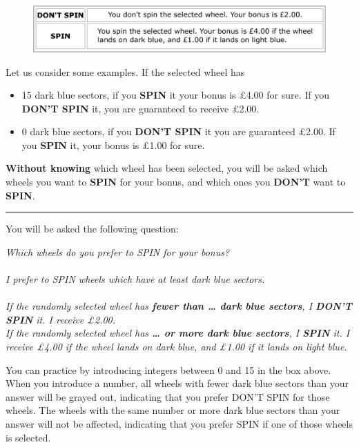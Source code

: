 \documentclass[pdftex,12pt, a4paper]{article}
\begin{document}
\begin{figure}[h!]
	\centering
	{\includegraphics[width=\linewidth]{Fig5_Options.pdf}}
\end{figure}

\noindent Let us consider some examples. If the selected wheel has
\begin{itemize}
\item 15 dark blue sectors, if you \textbf{SPIN} it your bonus is £4.00 for sure.
If you \textbf{DON'T SPIN} it, you are guaranteed to receive £2.00.
\item 0 dark blue sectors, if you \textbf{DON'T SPIN} it you are guaranteed £2.00.
If you \textbf{SPIN} it, your bonus is £1.00 for sure.
\end{itemize}

\noindent \textbf{Without knowing} which wheel has been selected, you will be asked which wheels you want to \textbf{SPIN} for your bonus, and which ones you \textbf{DON'T} want to \textbf{SPIN}.

\bigskip
\noindent \rule{\linewidth}{0.4pt}

\noindent You will be asked the following question:

\begin{mdframed}[backgroundcolor=LightBlue, linecolor=white]
\noindent \textit{Which wheels do you prefer to SPIN for your bonus?} \\
\\
\noindent \textit{I prefer to SPIN wheels which have at least \framebox[0.1\textwidth]{\rule{0pt}{15pt}} dark blue sectors.} \\
\\
\noindent \textit{If the randomly selected wheel has \textbf{fewer than … dark blue sectors}, I \textbf{DON’T SPIN} it.
I receive £2.00.} \\
\textit{If the randomly selected wheel has \textbf{… or more dark blue sectors}, I \textbf{SPIN} it.
I receive £4.00 if the wheel lands on dark blue, and £1.00 if it lands on light blue.}
\end{mdframed}

\noindent You can practice by introducing integers between 0 and 15 in the box above.
When you introduce a number, all wheels with fewer dark blue sectors than your answer will be grayed out, indicating that you prefer DON'T SPIN for those wheels.
The wheels with the same number or more dark blue sectors than your answer will not be affected, indicating that you prefer SPIN if one of those wheels is selected.
\end{document}
